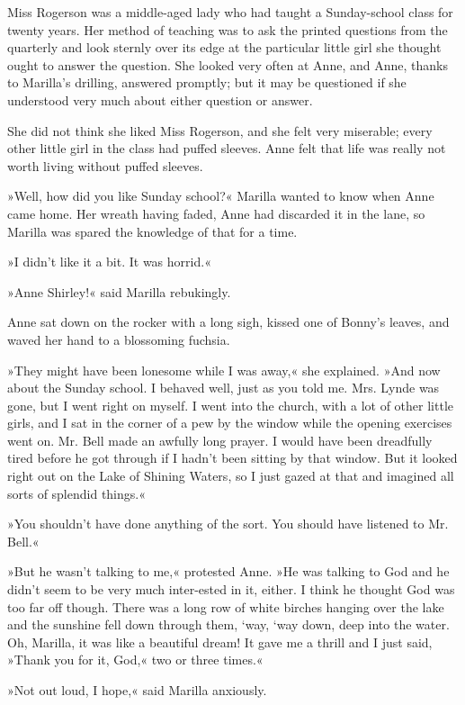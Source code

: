 Miss Rogerson was a middle-aged lady who had taught a Sunday-school class for twenty years. Her method of teaching was to ask the printed questions from the quarterly and look sternly over its edge at the particular little girl she thought ought to answer the question. She looked very often at Anne, and Anne, thanks to Marilla’s drilling, answered promptly; but it may be questioned if she understood very much about either question or answer.

She did not think she liked Miss Rogerson, and she felt very miserable; every other little girl in the class had puffed sleeves. Anne felt that life was really not worth living without puffed sleeves.

»Well, how did you like Sunday school?« Marilla wanted to know when Anne came home. Her wreath having faded, Anne had discarded it in the lane, so Marilla was spared the knowledge of that for a time.

»I didn’t like it a bit. It was horrid.«

»Anne Shirley!« said Marilla rebukingly.

Anne sat down on the rocker with a long sigh, kissed one of Bonny’s leaves, and waved her hand to a blossoming fuchsia.

»They might have been lonesome while I was away,« she explained. »And now about the Sunday school. I behaved well, just as you told me. Mrs. Lynde was gone, but I went right on myself. I went into the church, with a lot of other little girls, and I sat in the corner of a pew by the window while the opening exercises went on. Mr. Bell made an awfully long prayer. I would have been dreadfully tired before he got through if I hadn’t been sitting by that window. But it looked right out on the Lake of Shining Waters, so I just gazed at that and imagined all sorts of splendid things.«

»You shouldn’t have done anything of the sort. You should have listened to Mr. Bell.«

»But he wasn’t talking to me,« protested Anne. »He was talking to God and he didn’t seem to be very much inter-ested in it, either. I think he thought God was too far off though. There was a long row of white birches hanging over the lake and the sunshine fell down through them, ‘way, ‘way down, deep into the water. Oh, Marilla, it was like a beautiful dream! It gave me a thrill and I just said, »Thank you for it, God,« two or three times.«

»Not out loud, I hope,« said Marilla anxiously.

